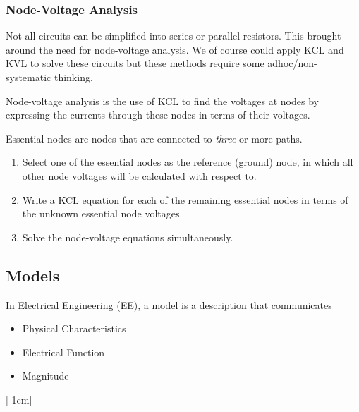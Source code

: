 \documentclass[12pt]{article}
\begin{document}
\subsubsection{Node-Voltage Analysis}
Not all circuits can be simplified into series or parallel resistors.
This brought around the need for node-voltage analysis.
We of course could apply KCL and KVL to solve these circuits but these methods require some adhoc/non-systematic thinking.

Node-voltage analysis is the use of KCL to find the voltages at nodes by expressing the currents through these nodes in terms of their voltages. 

Essential nodes are nodes that are connected to \textit{three} or more paths. 

\begin{enumerate}
  \item Select one of the essential nodes as the reference (ground) node, in which all other node voltages will be calculated with respect to.
  \item Write a KCL equation for each of the remaining essential nodes in terms of the unknown essential node voltages.
  \item Solve the node-voltage equations simultaneously.
\end{enumerate}

\begin{example}

\end{example}

\subsection{Models}
In Electrical Engineering (EE), a model is a description that communicates

\begin{itemize}
  \item Physical Characteristics 
  \item Electrical Function
  \item Magnitude
\end{itemize}

[-1cm]
\end{document}
